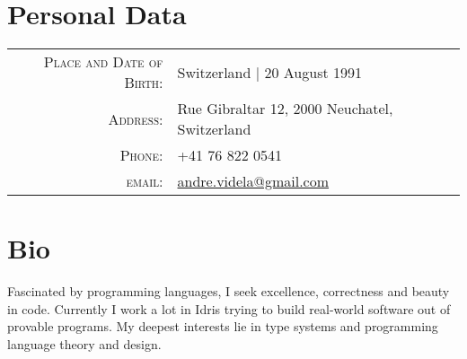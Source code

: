 \documentclass[a4paper,10pt]{article} %
\begin{document}
\pagestyle{empty} %


\par{\bigskip\par} %
\par{\bigskip\par} %
\section{Personal Data}

\begin{tabular}{rl}
\textsc{Place and Date of Birth:} & Switzerland  | 20 August 1991 \\
\textsc{Address:} & Rue Gibraltar 12, 2000 Neuchatel, Switzerland \\
\textsc{Phone:} & +41 76 822 0541\\
\textsc{email:} & \href{mailto:andre.videla@gmail.com}{andre.videla@gmail.com}
\end{tabular}


\section{Bio}
Fascinated by programming languages, I seek excellence, correctness and beauty in code. Currently I work a lot in Idris trying to build real-world software out of provable programs. My deepest interests lie in type systems and programming language theory and design.

\end{document}
